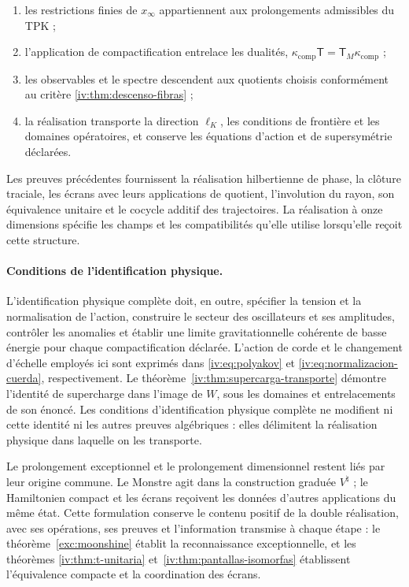 \begin{enumerate}
\item les restrictions finies de \(x_\infty\)
      appartiennent aux prolongements admissibles du TPK ;
\item l’application de compactification entrelace les dualités,
      \(\kappa_{\mathrm{comp}}\mathsf T
        =\mathsf T_M\kappa_{\mathrm{comp}}\) ;
\item les observables et le spectre descendent aux
      quotients choisis conformément au critère
      \ref{iv:thm:descenso-fibras} ;
\item la réalisation transporte la direction
      \(\ell_K\), les conditions de frontière et les
      domaines opératoires, et conserve les équations
      d’action et de supersymétrie déclarées.
\end{enumerate}

Les preuves précédentes fournissent la réalisation
hilbertienne de phase, la clôture traciale, les écrans
avec leurs applications de quotient, l’involution du rayon,
son équivalence unitaire et le cocycle additif des
trajectoires. La réalisation à onze dimensions
spécifie les champs et les compatibilités qu’elle
utilise lorsqu’elle reçoit cette structure.

\paragraph{Conditions de l’identification physique.}
\label{iv:condiciones-realizacion-fisica}
L’identification physique complète doit, en outre,
spécifier la tension et la normalisation de l’action,
construire le secteur des oscillateurs et ses amplitudes,
contrôler les anomalies et établir une limite
gravitationnelle cohérente de basse énergie pour chaque
compactification déclarée.
L’action de corde et le changement d’échelle employés
ici sont exprimés dans \eqref{iv:eq:polyakov}
et \eqref{iv:eq:normalizacion-cuerda}, respectivement.
Le théorème~\ref{iv:thm:supercarga-transporte}
démontre l’identité de supercharge dans l’image de
\(W\), sous les domaines et entrelacements de son
énoncé. Les conditions d’identification physique
complète ne modifient ni cette identité ni les autres
preuves algébriques : elles délimitent la réalisation physique
dans laquelle on les transporte.

Le prolongement exceptionnel et le prolongement dimensionnel
restent liés par leur origine commune. Le
Monstre agit dans la construction graduée
\(V^\natural\) ; le Hamiltonien compact et les
écrans reçoivent les données d’autres applications du
même état. Cette formulation conserve le
contenu positif de la double réalisation,
avec ses opérations, ses preuves et l’information
transmise à chaque étape : le théorème~\ref{exc:moonshine}
établit la reconnaissance exceptionnelle, et les théorèmes
\ref{iv:thm:t-unitaria} et~\ref{iv:thm:pantallas-isomorfas}
établissent l’équivalence compacte et la coordination des écrans.
